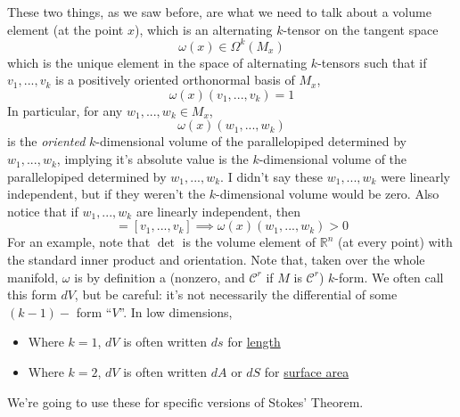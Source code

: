 \documentclass{article}
\newcommand{\reals}[0]{\mathbb{R}}
\newcommand{\mc}[1]{\mathcal{#1}}
\begin{document}
These two things, as we saw before, are what we need to talk about a volume element (at the point \(x\)), which is an alternating \(k\)-tensor on the tangent space
\begin{equation}
  \omega(x) \in \Omega^k(M_x)
\end{equation}
which is the unique element in the space of alternating \(k\)-tensors such that if \(v_1,...,v_k\) is a positively oriented orthonormal basis of \(M_x\),
\begin{equation}
  \omega(x)(v_1,...,v_k) = 1
\end{equation}
In particular, for any \(w_1,...,w_k \in M_x\),
\begin{equation}
  \omega(x)(w_1,...,w_k)
\end{equation}
is the \textit{oriented} \(k\)-dimensional volume of the parallelopiped determined by \(w_1,...,w_k\), implying it's absolute value is the \(k\)-dimensional volume of the parallelopiped determined by \(w_1,...,w_k\). I didn't say these \(w_1,...,w_k\) were linearly independent, but if they weren't the \(k\)-dimensional volume would be zero. Also notice that if \(w_1,...,w_k\) are linearly independent, then
\begin{equation}
  [w_1,...,w_k] = [v_1,...,v_k] \implies \omega(x)(w_1,...,w_k) > 0
\end{equation}
For an example, note that \(\det\) is the volume element of \(\reals^n\) (at every point) with the standard inner product and orientation.
Note that, taken over the whole manifold, \(\omega\) is by definition a (nonzero, and \(\mc{C}^r\) if \(M\) is \(\mc{C}^r\)) \(k\)-form. We often call this form \(dV\), but be careful: it's not necessarily the differential of some \((k - 1)-\) form ``\(V\)''. In low dimensions,
\begin{itemize}
  \item Where \(k = 1\), \(dV\) is often written \(ds\) for \underline{length}
  \item Where \(k = 2\), \(dV\) is often written \(dA\) or \(dS\) for \underline{surface area}
\end{itemize}
We're going to use these for specific versions of Stokes' Theorem.
\end{document}
